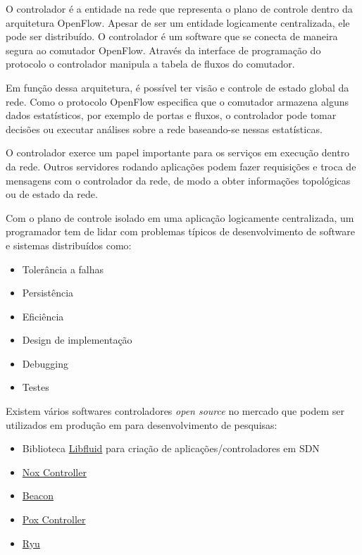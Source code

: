 O controlador é a entidade na rede que representa o plano de controle dentro
da arquitetura OpenFlow.
Apesar de ser um entidade logicamente centralizada, ele pode ser distribuído.
O controlador é um software que se conecta de maneira segura ao comutador
OpenFlow.
Através da interface de programação do protocolo o controlador manipula
a tabela de fluxos do comutador.

Em função dessa arquitetura, é possível ter visão e controle de estado global
da rede.
Como o protocolo OpenFlow especifica que o comutador armazena alguns dados
estatísticos, por exemplo de portas e fluxos, o controlador pode tomar
decisões ou executar análises sobre a rede baseando-se nessas estatísticas.

O controlador exerce um papel importante para os serviços em execução dentro
da rede.
Outros servidores rodando aplicações podem fazer requisições e troca de
mensagens com o controlador da rede, de modo a obter informações topológicas
ou de estado da rede.

Com o plano de controle isolado em uma aplicação logicamente centralizada,
um programador tem de lidar com problemas típicos de desenvolvimento de
software e sistemas distribuídos como:

\begin{itemize}
    \item Tolerância a falhas
    \item Persistência
    \item Eficiência
    \item Design de implementação
    \item Debugging
    \item Testes
\end{itemize}

Existem vários softwares controladores \emph{open source} no mercado que
podem ser utilizados em produção em para desenvolvimento de pesquisas:

\begin{itemize}
    \item Biblioteca \href{http://opennetworkingfoundation.github.io/libfluid/index.html}{Libfluid}
        para criação de aplicações/controladores em SDN \citep{libfluid2015}
    \item \href{http://www.noxrepo.org/nox/about-nox/}{Nox Controller}
        \citep{nox2015}
    \item \href{https://openflow.stanford.edu/display/Beacon/Home}{Beacon}
        \citep{beacon2015}
    \item \href{http://www.noxrepo.org/pox/about-pox/}{Pox Controller}
        \citep{pox2015}
    \item \href{http://osrg.github.io/ryu/}{Ryu} \citep{ryu2015}
\end{itemize}

